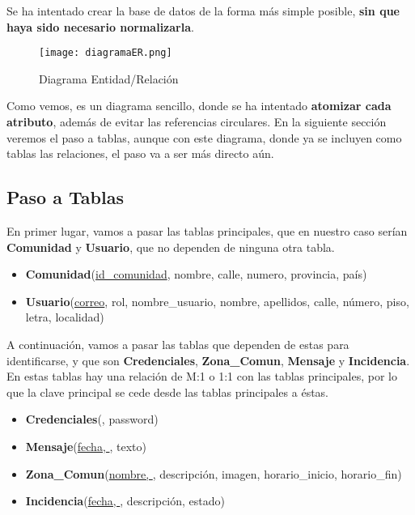 Se ha intentado crear la base de datos de la forma más simple posible, \textbf{sin que haya sido necesario normalizarla}.

\begin{figure}[H]
	\centering
	\texttt{[image: diagramaER.png]}
	\caption{Diagrama Entidad/Relación}
\end{figure}

Como vemos, es un diagrama sencillo, donde se ha intentado \textbf{atomizar cada atributo}, además de evitar las referencias circulares. En la siguiente sección veremos el paso a tablas, aunque con este diagrama, donde ya se incluyen como tablas las relaciones, el paso va a ser más directo aún.

\subsection{Paso a Tablas}
En primer lugar, vamos a pasar las tablas principales, que en nuestro caso serían \textbf{Comunidad} y \textbf{Usuario}, que no dependen de ninguna otra tabla.

\begin{itemize}
	\item \textbf{Comunidad}(\underline{id\_comunidad}, nombre, calle, numero, provincia, país)
	\item \textbf{Usuario}(\underline{correo}, rol, nombre\_usuario, nombre, apellidos, calle, número, piso, letra, localidad)
\end{itemize}

A continuación, vamos a pasar las tablas que dependen de estas para identificarse, y que son \textbf{Credenciales}, \textbf{Zona\_Comun}, \textbf{Mensaje} y \textbf{Incidencia}. En estas tablas hay una relación de M:1 o 1:1 con las tablas principales, por lo que la clave principal se cede desde las tablas principales a éstas.

\begin{itemize}
	\item \textbf{Credenciales}(\uline{}, password)
	\item \textbf{Mensaje}(\uline{fecha, }, texto)
	\item \textbf{Zona\_Comun}(\uline{nombre, }, descripción, imagen, horario\_inicio, horario\_fin)
	\item \textbf{Incidencia}(\uline{fecha, }, descripción, estado)
\end{itemize}

